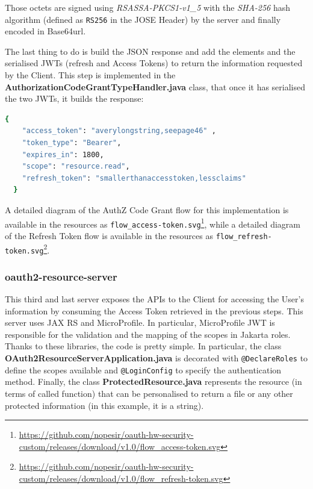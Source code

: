 \documentclass[a4paper,12pt]{article}
\begin{document}
Those octets are signed using \textit{RSASSA-PKCS1-v1\_5} with the \textit{SHA-256} hash algorithm (defined as \texttt{RS256} in the JOSE Header) by the server and finally encoded in Base64url.

The last thing to do is build the JSON response and add the elements and the serialised JWTs (refresh and Access Tokens) to return the information requested by the Client. This step is implemented in the \textbf{AuthorizationCodeGrantTypeHandler.java} class, that once it has serialised the two JWTs, it builds the response:

\begin{lstlisting}[language=bash, basicstyle=\ttfamily]
  {
    "access_token": "averylongstring,seepage46" ,
    "token_type": "Bearer",  
    "expires_in": 1800,
    "scope": "resource.read",
    "refresh_token": "smallerthanaccesstoken,lessclaims"
  }
\end{lstlisting}

A detailed diagram of the AuthZ Code Grant flow for this implementation is available in the resources as \texttt{flow\_access-token.svg}\footnote{\url{https://github.com/nopesir/oauth-hw-security-custom/releases/download/v1.0/flow_access-token.svg}}, while a detailed diagram of the Refresh Token flow is available in the resources as \texttt{flow\_refresh-token.svg}\footnote{\url{https://github.com/nopesir/oauth-hw-security-custom/releases/download/v1.0/flow_refresh-token.svg}}.

\subsubsection{oauth2-resource-server}
This third and last server exposes the APIs to the Client for accessing the User's information by consuming the Access Token retrieved in the previous steps. This server uses JAX RS and MicroProfile. In particular, MicroProfile JWT is responsible for the validation and the mapping of the scopes in Jakarta roles. Thanks to these libraries, the code is pretty simple. In particular, the class \textbf{OAuth2ResourceServerApplication.java} is decorated with \texttt{@DeclareRoles} to define the scopes available and \texttt{@LoginConfig} to specify the authentication method. Finally, the class \textbf{ProtectedResource.java} represents the resource (in terms of called function) that can be personalised to return a file or any other protected information (in this example, it is a string).
\end{document}

